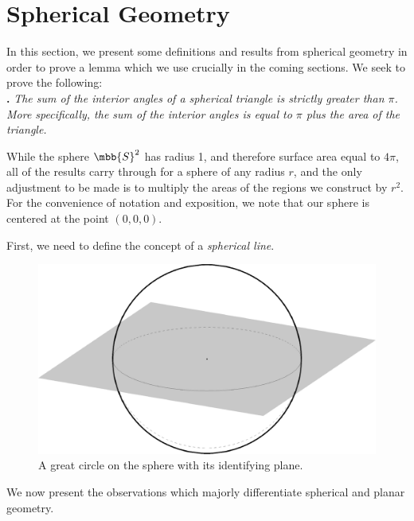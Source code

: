 \section{Spherical Geometry}
In this section, we present some definitions and results from spherical geometry in order to prove a lemma which we use crucially in the coming sections.  We seek to prove the following:\\

\noindent\textbf{.}
\emph{The sum of the interior angles of a spherical triangle is strictly greater than $\pi$.  More specifically, the sum of the interior angles is equal to $\pi$ plus the area of the triangle.}


While  the sphere $\mbb{S}^2$ has radius 1, and therefore surface area equal to $4\pi$, all of the results carry through for a sphere of any radius $r$, and the only adjustment to be made is to multiply the areas of the regions we construct by $r^2$.  For the convenience of notation and exposition, we note that our sphere is centered at the point $(0,0,0)$.

First, we need to define the concept of a \textit{spherical line}.  


\begin{figure}[htb]
	\centering
	\includegraphics[width=.5\textwidth]{figs/sph-1pl.pdf}
	\caption{A great circle on the sphere with its identifying plane.}
	\label{fig:sphereline}
\end{figure}










We now present the observations which majorly differentiate spherical and planar geometry.


